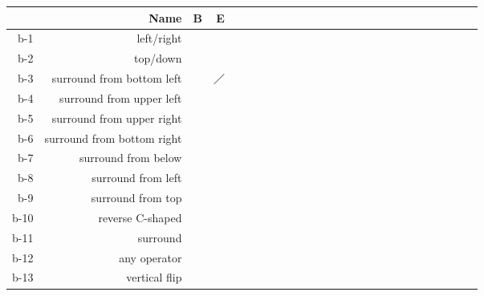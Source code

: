 \begin{tabular}[pos]{ | r | r | c | r | c | c | l | r | r | c | c | r | r | c | r | c | c | l | r | r | c | r | c | c | c | l | }
\hline
 & {\mktsStyleBold{}Name} & {\mktsStyleBold{}B} & {\mktsStyleBold{}E}\\

\hline
{\mktsStyleBold{}b-1} & left/right & {\cjk{}{\cnjzr{}}} & {\cjk{}{\cnjzr{}}}\\
{\mktsStyleBold{}b-2} & top/down & {\cjk{}{\cnjzr{}}} & {\cjk{}{\cnjzr{}}}\\
{\mktsStyleBold{}b-3} & surround from bottom left & {\cjk{}{\cnjzr{}}} & {\cjk{}／}\\
{\mktsStyleBold{}b-4} & surround from upper left & {\cjk{}{\cnjzr{}}} & {\cjk{}{\cnjzr{}}}\\
{\mktsStyleBold{}b-5} & surround from upper right & {\cjk{}{\cnjzr{}}} & {\cjk{}{\cnjzr{}}}\\
{\mktsStyleBold{}b-6} & surround from bottom right & {\cjk{}{\cnjzr{}}} & {\cjk{}{\cnjzr{}}}\\
{\mktsStyleBold{}b-7} & surround from below & {\cjk{}{\cnjzr{}}} & {\cjk{}{\cnjzr{}}}\\
{\mktsStyleBold{}b-8} & surround from left & {\cjk{}{\cnjzr{}}} & {\cjk{}{\cnjzr{}}}\\
{\mktsStyleBold{}b-9} & surround from top & {\cjk{}{\cnjzr{}}} & {\cjk{}{\cnjzr{}}}\\
{\mktsStyleBold{}b-10} & reverse C-shaped & {\cjk{}{\cnjzr{}}} & {\cjk{}{\cnjzr{}}}\\
{\mktsStyleBold{}b-11} & surround & {\cjk{}{\cnjzr{}}} & {\cjk{}{\cnjzr{}}}\\
{\mktsStyleBold{}b-12} & any operator &  & {\cjk{}{\cnjzr{}}}\\
{\mktsStyleBold{}b-13} & vertical flip &  & {\cjk{}{\cnjzr{}}}\\
\hline
\end{tabular}

